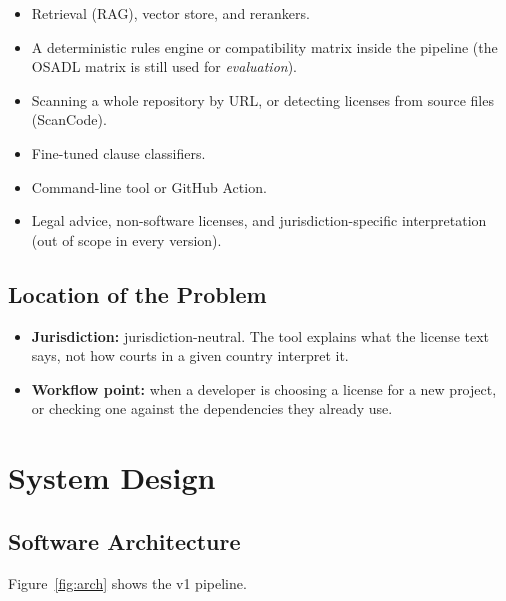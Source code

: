 \documentclass[11pt]{article}
\begin{document}
\begin{itemize}
  \item Retrieval (RAG), vector store, and rerankers.
  \item A deterministic rules engine or compatibility matrix inside the pipeline (the OSADL matrix is still used for \emph{evaluation}).
  \item Scanning a whole repository by URL, or detecting licenses from source files (ScanCode).
  \item Fine-tuned clause classifiers.
  \item Command-line tool or GitHub Action.
  \item Legal advice, non-software licenses, and jurisdiction-specific interpretation (out of scope in every version).
\end{itemize}

\subsection{Location of the Problem}

\begin{itemize}
  \item \textbf{Jurisdiction:} jurisdiction-neutral. The tool explains what the license text says, not how courts in a given country interpret it.
  \item \textbf{Workflow point:} when a developer is choosing a license for a new project, or checking one against the dependencies they already use.
\end{itemize}

\section{System Design}

\subsection{Software Architecture}

Figure~\ref{fig:arch} shows the v1 pipeline.
\end{document}
